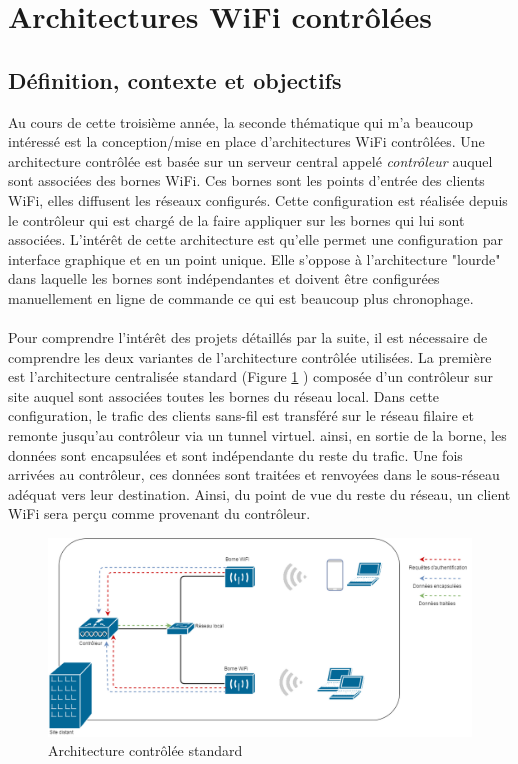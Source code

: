 \documentclass[a4paper,12pt]{report}
\begin{document}
\section{Architectures WiFi contrôlées}
\subsection{Définition, contexte et objectifs}
Au cours de cette troisième année, la seconde thématique qui m'a beaucoup intéressé est la conception/mise en place d'architectures WiFi contrôlées. Une architecture contrôlée est basée sur un serveur central appelé \textit{contrôleur} auquel sont associées des bornes WiFi. Ces bornes sont les points d'entrée des clients WiFi, elles diffusent les réseaux configurés. Cette configuration est réalisée depuis le contrôleur qui est chargé de la faire appliquer sur les bornes qui lui sont associées. L'intérêt de cette architecture est qu'elle permet une configuration par interface graphique et en un point unique. Elle s'oppose à l'architecture "lourde" dans laquelle les bornes sont indépendantes et doivent être configurées manuellement en ligne de commande ce qui est beaucoup plus chronophage.
\paragraph{}
Pour comprendre l'intérêt des projets détaillés par la suite, il est nécessaire de comprendre les deux variantes de l'architecture contrôlée utilisées. La première est l'architecture centralisée standard (Figure \ref{wifi_standard} ) composée d'un contrôleur sur site auquel sont associées toutes les bornes du réseau local. Dans cette configuration, le trafic des clients sans-fil est transféré sur le réseau filaire et remonte jusqu'au contrôleur via un tunnel virtuel. ainsi, en sortie de la borne, les données sont encapsulées et sont indépendante du reste du trafic. Une fois arrivées au contrôleur, ces données sont traitées et renvoyées dans le sous-réseau adéquat vers leur destination. Ainsi, du point de vue du reste du réseau, un client WiFi sera perçu comme provenant du contrôleur.
\begin{figure}[h]
\includegraphics[scale=0.4]{../rapport_photos/wifi.png} 
\caption{Architecture contrôlée standard}
\label{wifi_standard}
\end{figure}
\end{document}
